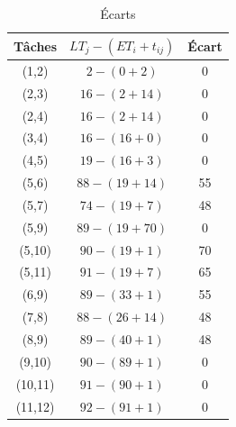 \documentclass{article}
\begin{document}
\begin{table}[H]
    \caption{Écarts} \label{tab:ecarts}
    \begin{center}
        \begin{tabular}{|c|c|c|}
           \hline
           Tâches & $LT_j-(ET_i+t_{ij})$ & Écart \\
           \hline 
           (1,2) & $2-(0+2)$ & 0 \\

           (2,3) & $16-(2+14)$ & 0 \\

           (2,4) & $16-(2+14)$ & 0 \\

           (3,4) & $16-(16+0)$ & 0 \\

           (4,5) & $19-(16+3)$ & 0 \\

           (5,6) & $88-(19+14)$ & 55 \\
           
           (5,7) & $74-(19+7)$ & 48 \\
           
           (5,9) & $89-(19+70)$ & 0 \\
           
           (5,10) & $90-(19+1)$ & 70 \\

           
           (5,11) & $91-(19+7)$ & 65 \\

           (6,9) & $89-(33+1)$ & 55 \\
           
           (7,8) & $88 - (26 + 14)$ & 48 \\
           
           (8,9) & $89-(40+1)$ & 48 \\
           
           (9,10) & $90-(89+1)$ & 0 \\
           
           (10,11) & $91 - (90 + 1)$ & 0 \\
           
           (11,12) & $92-(91+1)$ & 0 \\


            \hline
                                                     
                        
                                        
        \end{tabular}
    \end{center}
\end{table}
\end{document}
